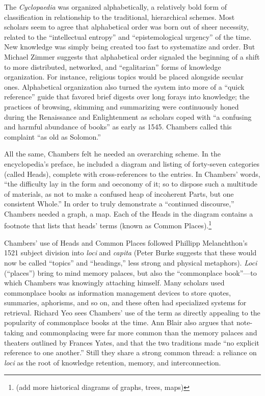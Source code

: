 The \emph{Cyclopaedia} was organized alphabetically, a relatively bold form of classification in relationship to the traditional, hierarchical schemes. Most scholars seem to agree that alphabetical order was born out of sheer necessity, related to the ``intellectual entropy'' and ``epistemological urgency'' of the time.\autocite[5]{rosenberg_early_2003} New knowledge was simply being created too fast to systematize and order. But Michael Zimmer suggests that alphabetical order signaled the beginning of a shift to more distributed, networked, and ``egalitarian'' forms of knowledge organization.\autocite[100]{zimmer_renvois_2009} For instance, religious topics would be placed alongside secular ones. Alphabetical organization also turned the system into more of a ``quick reference'' guide that favored brief digests over long forays into knowledge; the practices of browsing, skimming and summarizing were continuously honed during the Renaissance and Enlightenment as scholars coped with ``a confusing and harmful abundance of books'' as early as 1545.\autocite{blair_reading_2003} Chambers called this complaint ``as old as Solomon.''\autocite[11]{yeo_solution_2003}

All the same, Chambers felt he needed an overarching scheme. In the encyclopedia's preface, he included a diagram and listing of forty-seven categories (called Heads), complete with cross-references to the entries. In Chambers' words, ``the difficulty lay in the form and oeconomy of it; so to dispose such a multitude of materials, as not to make a confused heap of incoherent Parts, but one consistent Whole.''\autocite[67]{yeo_solution_2003} In order to truly demonstrate a ``continued discourse,'' Chambers needed a graph, a map. Each of the Heads in the diagram contains a footnote that lists that heads' terms (known as Common Places).\footnote{(add more historical diagrams of graphs, trees, maps)}

Chambers' use of Heads and Common Places followed Phillipp Melanchthon's 1521 subject division into \emph{loci} and \emph{capita} (Peter Burke suggests that these would now be called ``topics'' and ``headings,'' less strong and physical metaphors).\autocite[95]{burke_social_2000} \emph{Loci} (``places'') bring to mind memory palaces, but also the ``commonplace book''---to which Chambers was knowingly attaching himself. Many scholars used commonplace books as information management devices to store quotes, summaries, aphorisms, and so on, and these often had specialized systems for retrieval. Richard Yeo sees Chambers' use of the term as directly appealing to the popularity of commonplace books at the time.\autocite[65-66]{yeo_solution_2003} Ann Blair also argues that note-taking and commonplacing were far more common than the memory palaces and theaters outlined by Frances Yates, and that the two traditions made ``no explicit reference to one another.''\autocite[``Note Taking as an Aid to Memory'']{blair_too_2010} Still they share a strong common thread: a reliance on \emph{loci} as the root of knowledge retention, memory, and interconnection.

